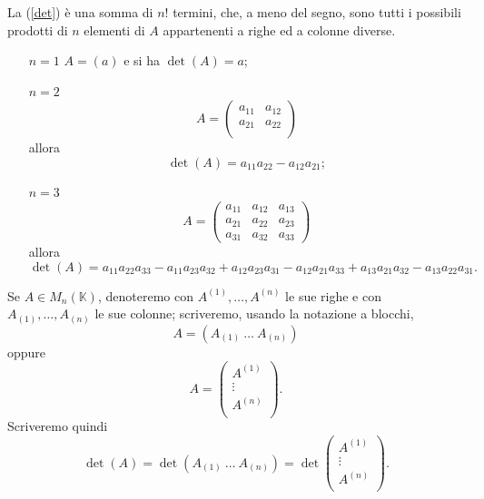 \documentclass{article}
\theoremstyle{plain}
\theoremstyle{definition}
\theoremstyle{remark}
\begin{document}
\vspace{10pt}

La (\ref{det}) è una somma di $n!$ termini, che, a meno del segno, sono tutti i possibili prodotti di $n$ elementi di $A$ appartenenti a righe ed a colonne diverse.
\begin{itemize}
    \item[$n=1$] $A=(a)$ e si ha $\det(A)=a$;
    \item[$n=2$] \[A=\begin{pmatrix}
        a_{11}&a_{12}\\
        a_{21}&a_{22}\\
    \end{pmatrix}\]
    allora \[\det(A)=a_{11}a_{22}-a_{12}a_{21};\]
    \item[$n=3$] \[A=\begin{pmatrix}
        a_{11}&a_{12}&a_{13}\\
        a_{21}&a_{22}&a_{23}\\
        a_{31}&a_{32}&a_{33}
    \end{pmatrix}\]
    allora 
    \[
        \det(A)=
         a_{11}a_{22}a_{33}
        -a_{11}a_{23}a_{32}
        +a_{12}a_{23}a_{31}
        -a_{12}a_{21}a_{33}
        +a_{13}a_{21}a_{32}
        -a_{13}a_{22}a_{31}.
    \]

\end{itemize}

\vspace{10pt}

Se $A\in M_n(\mathbb{K})$, denoteremo con $A^{(1)},\dots,A^{(n)}$ le sue righe e con $A_{(1)},\dots,A_{(n)}$ le sue colonne; scriveremo, usando la notazione a blocchi,
\[A=(A_{(1)} \ \dots \ A_{(n)})\] oppure
\[A=\begin{pmatrix}
    A^{(1)}\\
    \vdots\\
    A^{(n)}\\
\end{pmatrix}.\]
Scriveremo quindi 
\[\det(A)=\det(A_{(1)} \ \dots \ A_{(n)})=\det\begin{pmatrix}
    A^{(1)}\\
    \vdots\\
    A^{(n)}\\
\end{pmatrix}.\]

\vspace{10pt}
\end{document}
